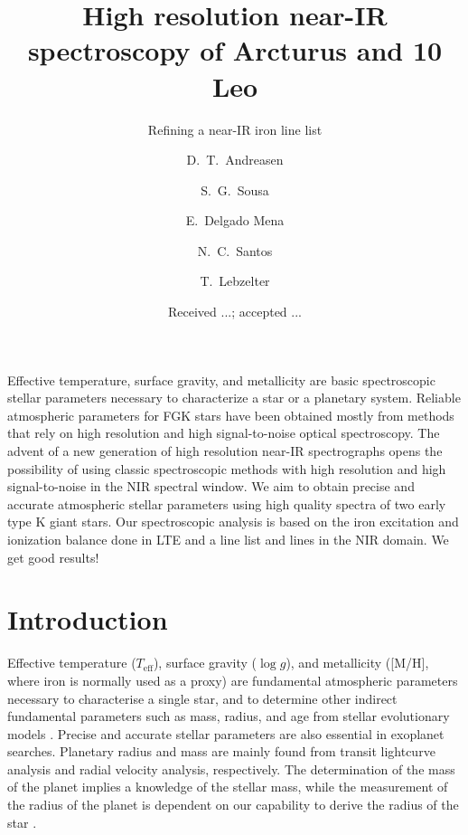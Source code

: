 \documentclass{aa}
\begin{document}
\title{High resolution near-IR spectroscopy of Arcturus and 10 Leo}
\subtitle{Refining a near-IR iron line list}


\author{ D.~T.~Andreasen
    \and S.~G.~Sousa
    \and E.~Delgado Mena
    \and N.~C.~Santos
    \and T.~Lebzelter}







\date{Received ...; accepted ...}

\abstract
{Effective temperature, surface gravity, and metallicity are basic
spectroscopic stellar parameters necessary to characterize
a star or a planetary system. Reliable atmospheric parameters for
FGK stars have been obtained mostly from methods that rely on high
resolution and high signal-to-noise optical spectroscopy. The
advent of a new generation of high resolution near-IR spectrographs
opens the possibility of using classic spectroscopic methods with
high resolution and high signal-to-noise in the NIR spectral window.}
{We aim to obtain precise and accurate atmospheric stellar parameters using
high quality spectra of two early type K giant stars.}
{Our spectroscopic analysis is based on the iron excitation and ionization
balance done in LTE and a line list  and  lines in the
NIR domain.}
{We get good results!}
{}



\maketitle



\section{Introduction}
\label{sec:introduction}

Effective temperature ($T_\mathrm{eff}$), surface gravity ($\log g$),
and metallicity ([M/H], where iron is normally used as a proxy)
are fundamental atmospheric parameters necessary to characterise a single
star, and to determine other indirect fundamental parameters
such as mass, radius, and age from stellar evolutionary models
\citep[see e.g.][]{Girardi2000,Dotter2008,Baraffe2015}.
Precise and accurate stellar parameters are also essential in
exoplanet searches. Planetary radius and mass are mainly found from
transit lightcurve analysis and radial velocity analysis, respectively. The
determination of the mass of the planet implies a knowledge of the
stellar mass, while the measurement of the radius of the planet
is dependent on our capability to derive the radius of the star
\citep[see e.g.][]{Torres2008,Ammler2009,Torres2012}.
\end{document}

